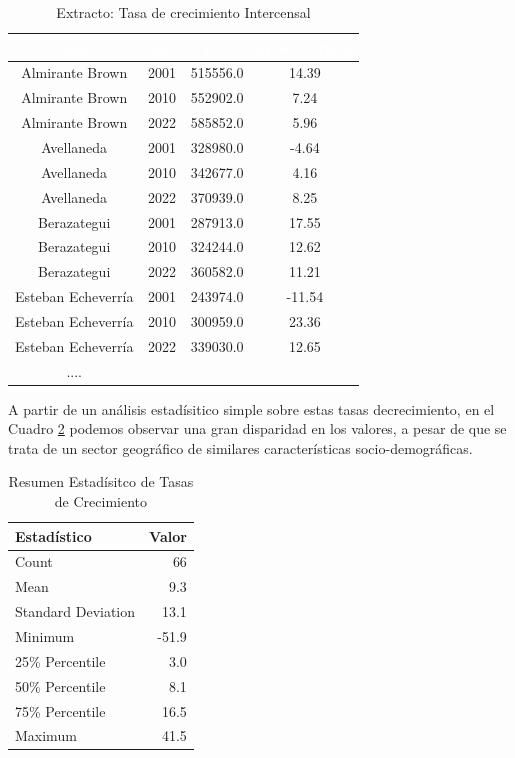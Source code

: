 \documentclass{article}
\theoremstyle{mytheoremstyle}
\theoremstyle{mytheoremstyle}
\theoremstyle{myproblemstyle}
\begin{document}
  \begin{table}[htb]
    \centering
    \begin{tabular}{|c|c|c|c|}
    \hline
    \textbf{\cellcolor[rgb]{0,0.231,0.427}\textcolor{white}{nam}} &
     \textbf{\cellcolor[rgb]{0,0.231,0.427}\textcolor{white}{anio}}
      & \textbf{\cellcolor[rgb]{0,0.231,0.427}\textcolor{white}{pob}}
       & \textbf{\cellcolor[rgb]{0,0.231,0.427}\textcolor{white}{growth\_ratio}} \\ \hline
    Almirante Brown & 2001 & 515556.0 & 14.39 \\
    Almirante Brown & 2010 & 552902.0 & 7.24 \\
    Almirante Brown & 2022 & 585852.0 & 5.96 \\
    Avellaneda & 2001 & 328980.0 & -4.64 \\
    Avellaneda & 2010 & 342677.0 & 4.16 \\
    Avellaneda & 2022 & 370939.0 & 8.25 \\
    Berazategui & 2001 & 287913.0 & 17.55 \\
    Berazategui & 2010 & 324244.0 & 12.62 \\
    Berazategui & 2022 & 360582.0 & 11.21 \\
    Esteban Echeverría & 2001 & 243974.0 & -11.54 \\
    Esteban Echeverría & 2010 & 300959.0 & 23.36 \\
    Esteban Echeverría & 2022 & 339030.0 & 12.65 \\
      ....& & & \\
  
    \hline
    \end{tabular}
    \caption{Extracto: Tasa de crecimiento Intercensal}
  \label{tab:RatiosAll}
    \end{table}
  

    A partir de un análisis estadísitico simple sobre estas tasas decrecimiento, en el Cuadro \ref{tab:summary_growth_ratio} 
    podemos observar una gran disparidad en los valores, a pesar de que se trata de un sector geográfico de similares características socio-demográficas. 
\begin{table}[htbp]
    \centering
    \begin{tabular}{lr}
        \hline
        \textbf{Estadístico} & \textbf{Valor} \\
        \hline
        Count & 66\\
        Mean & 9.3 \\
        Standard Deviation & 13.1 \\
        Minimum & -51.9 \\
        25\% Percentile & 3.0 \\
        50\% Percentile & 8.1\\
        75\% Percentile & 16.5 \\
        Maximum & 41.5 \\
        \hline
    \end{tabular}
    \caption{Resumen Estadísitco de Tasas de Crecimiento}
    \label{tab:summary_growth_ratio}
\end{table}
\newline\newline
\end{document}
